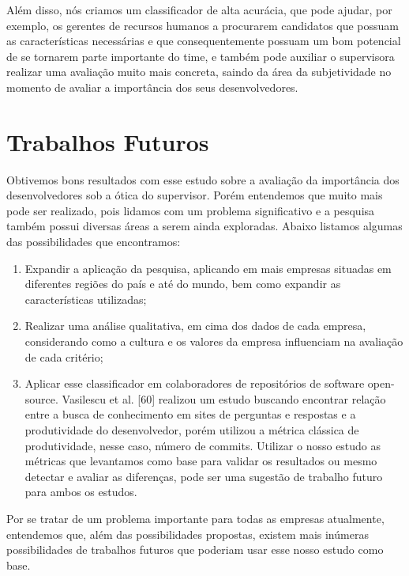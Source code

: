 Além disso, nós criamos um classificador de alta acurácia, que pode ajudar, por exemplo, os gerentes de recursos humanos a procurarem candidatos que possuam as características necessárias e que consequentemente possuam um bom potencial de se tornarem parte importante do time, e também pode auxiliar o supervisora realizar uma avaliação muito mais concreta, saindo da área da subjetividade no momento de avaliar a importância dos seus desenvolvedores.


\section{Trabalhos Futuros}

Obtivemos bons resultados com esse estudo sobre a avaliação da importância dos desenvolvedores sob a ótica do supervisor. Porém entendemos que muito mais pode ser realizado, pois lidamos com um problema significativo e a pesquisa também possui diversas áreas a serem ainda exploradas. Abaixo listamos algumas das possibilidades que encontramos:
\begin{enumerate}
	\item Expandir a aplicação da pesquisa, aplicando em mais empresas situadas em diferentes regiões do país e até do mundo, bem como expandir as características utilizadas;
	\item Realizar uma análise qualitativa, em cima dos dados de cada empresa, considerando como a cultura e os valores da empresa influenciam na avaliação de cada critério;
	\item Aplicar esse classificador em colaboradores de repositórios de software open-source. Vasilescu et al. [60] realizou um estudo buscando encontrar relação entre a busca de conhecimento em sites de perguntas e respostas e a produtividade do desenvolvedor, porém utilizou a métrica clássica de produtividade, nesse caso, número de commits. Utilizar o nosso estudo as métricas que levantamos como base para validar os resultados ou mesmo detectar e avaliar as diferenças, pode ser uma sugestão de trabalho futuro para ambos os estudos.
\end{enumerate}

Por se tratar de um problema importante para todas as empresas atualmente, entendemos que, além das possibilidades propostas, existem mais inúmeras possibilidades de trabalhos futuros que poderiam usar esse nosso estudo como base.

